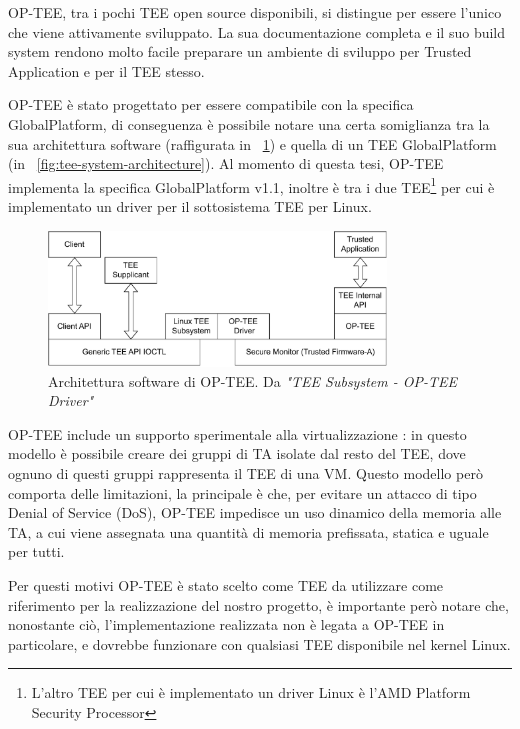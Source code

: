 \documentclass[12pt,italian]{report}
\begin{document}
OP-TEE, tra i pochi TEE open source disponibili, si distingue per
essere l'unico che viene attivamente sviluppato.
La sua documentazione completa e il suo build system rendono molto facile
preparare un ambiente di sviluppo per Trusted Application e
per il TEE stesso.

OP-TEE è stato progettato per essere compatibile con la specifica
GlobalPlatform, di conseguenza è possibile notare una certa somiglianza
tra la sua architettura software (raffigurata in
\figurename~\ref{fig:optee-system-architecture})
e quella di un TEE GlobalPlatform
(in \figurename~\ref{fig:tee-system-architecture}).
Al momento di questa tesi, OP-TEE implementa la specifica GlobalPlatform v1.1,
inoltre è tra i due TEE\footnote{
        L'altro TEE per cui è implementato un driver Linux è
        l'AMD Platform Security Processor
} per cui è implementato un driver per il sottosistema TEE per Linux.

\begin{figure}
    \centering
    \includegraphics[width=0.8\textwidth]{immagini/optee-system-architecture}
    \caption{
        Architettura software di OP-TEE.
        Da \textit{"TEE Subsystem - OP-TEE Driver"}\cite{linux_tee_subsystem}
    }
    \label{fig:optee-system-architecture}
\end{figure}

OP-TEE include un supporto sperimentale alla virtualizzazione
\cite{optee_virtualization}: in questo
modello è possibile creare dei gruppi di TA isolate dal resto del TEE,
dove ognuno di questi gruppi rappresenta il TEE di una VM.
Questo modello però comporta delle limitazioni, la principale è che,
per evitare un attacco di tipo Denial of Service (DoS), OP-TEE impedisce
un uso dinamico della memoria alle TA, a cui viene assegnata una quantità
di memoria prefissata, statica e uguale per tutti.

Per questi motivi OP-TEE è stato scelto come TEE da utilizzare
come riferimento per la realizzazione del nostro progetto, è
importante però notare che, nonostante ciò, l'implementazione realizzata
non è legata a OP-TEE in particolare, e dovrebbe funzionare con qualsiasi
TEE disponibile nel kernel Linux.
\end{document}

